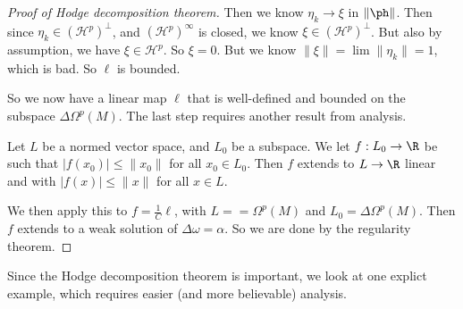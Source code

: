 \documentclass[a4paper]{article}
\begin{document}
\begin{proof}[Proof of Hodge decomposition theorem]
  Then we know $\eta_k\to \xi$ in $\| \ph\|$. Then since $\eta_k \in (\mathcal{H}^p)^\perp$, and $(\mathcal{H}^p)^\infty$ is closed, we know $\xi \in (\mathcal{H}^p)^\perp$. But also by assumption, we have $\xi \in \mathcal{H}^p$. So $\xi = 0$. But we know $\|\xi\| = \lim \|\eta_k\| = 1$, which is bad. So $\ell$ is bounded.

  So we now have a linear map $\ell$ that is well-defined and bounded on the subspace $\Delta \Omega^p(M)$. The last step requires another result from analysis.
  \begin{thm}
    Let $L$ be a normed vector space, and $L_0$ be a subspace. We let $f: L_0 \to \R$ be such that $|f(x_0)| \leq \|x_0\|$ for all $x_0 \in L_0$. Then $f$ extends to $L \to \R$ linear and with $|f(x)| \leq \|x\|$ for all $x \in L$.
  \end{thm}
  We then apply this to $f = \frac{1}{C}\ell$, with $L = = \Omega^p(M)$ and $L_0 = \Delta \Omega^p(M)$. Then $f$ extends to a weak solution of $\Delta \omega = \alpha$. So we are done by the regularity theorem.
\end{proof}

Since the Hodge decomposition theorem is important, we look at one explict example, which requires easier (and more believable) analysis.
\end{document}
